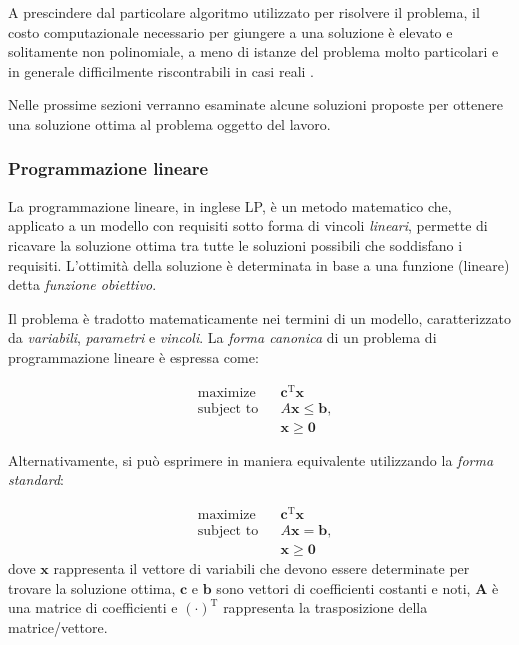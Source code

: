 A prescindere dal particolare algoritmo utilizzato per risolvere il problema, 
il costo computazionale necessario per giungere a una soluzione è elevato e 
solitamente non polinomiale, a meno di istanze del problema molto particolari e 
in generale difficilmente riscontrabili in casi reali 
\cite{PolynomialCompleteScheduling}.

Nelle prossime sezioni verranno esaminate alcune soluzioni proposte per 
ottenere una soluzione ottima al problema oggetto del lavoro.

\subsubsection{Programmazione lineare}
La programmazione lineare, in inglese \ac{LP}, è un metodo matematico che, 
applicato a un modello con requisiti sotto forma di vincoli \emph{lineari}, 
permette di ricavare la soluzione ottima tra tutte le soluzioni possibili che 
soddisfano i requisiti. L'ottimità della soluzione è determinata in base a una 
funzione (lineare) detta \emph{funzione obiettivo}.

Il problema è tradotto matematicamente nei termini di un modello, 
caratterizzato da \emph{variabili}, \emph{parametri} e \emph{vincoli}.
La \emph{forma canonica} di un problema di programmazione lineare è espressa 
come:

\begin{align*}
& \text{maximize}   && \mathbf{c}^\mathrm{T} \mathbf{x}\\
& \text{subject to} && A \mathbf{x} \le \mathbf{b},\\
&  && \mathbf{x} \ge \mathbf{0}
\end{align*}

Alternativamente, si può esprimere in maniera equivalente utilizzando la 
\emph{forma standard}:

\begin{align*}
 & \text{maximize}   && \mathbf{c}^\mathrm{T} \mathbf{x}\\
& \text{subject to} && A \mathbf{x} = \mathbf{b}, \\
&  && \mathbf{x} \ge \mathbf{0}
\end{align*}
dove $\mathbf{x}$ rappresenta il vettore di variabili che devono essere 
determinate per trovare la soluzione ottima, $\mathbf{c}$ e $\mathbf{b}$ sono 
vettori di coefficienti costanti e noti, $\mathbf{A}$ è una matrice di 
coefficienti e $(\mathord{\cdot})^\mathrm{T}$ 
rappresenta la trasposizione della matrice/vettore.

